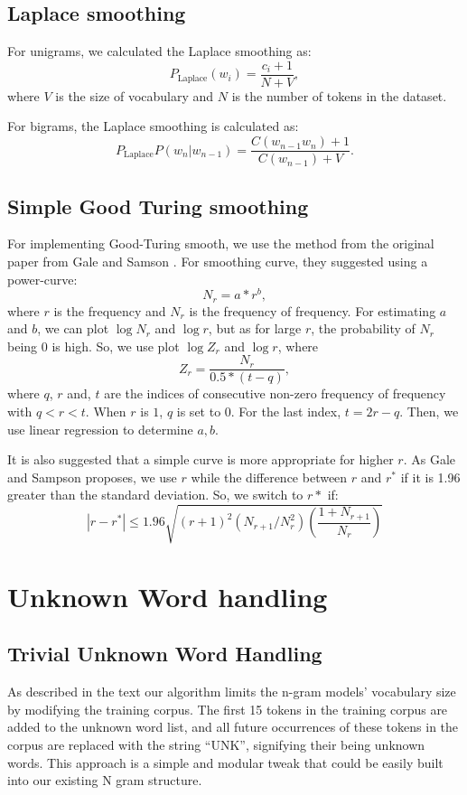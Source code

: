 \documentclass[12pt]{article}
\begin{document}
\subsection{Laplace smoothing}
For unigrams, we calculated the Laplace smoothing as:
\[P_{\text{Laplace}}(w_i) = \frac{c_i + 1}{N + V},\]
where $V$ is the size of vocabulary and $N$ is the number of tokens
in the dataset.

For bigrams, the Laplace smoothing is calculated as:
\[P_{\text{Laplace}}P(w_n|w_{n-1}) = 
\frac{C(w_{n-1}w_n)  + 1}{C(w_{n-1}) + V}.\]

\subsection{Simple Good Turing smoothing}

For implementing Good-Turing smooth, we use the method from the original
paper from Gale and Samson \cite{gale1995good}. For smoothing curve,
they suggested using a power-curve:
\[N_r = a * r^b,\]
where $r$ is the frequency and $N_r$ is the frequency of frequency. For
estimating $a$ and $b$, we can plot $\log N_r$ and $\log r$, but as for
large $r$, the probability of $N_r$ being $0$ is high. So, we use plot
$\log Z_r$ and $\log r$, where
\[Z_r = \frac{N_r}{0.5 * (t-q)},\]
where $q$, $r$ and, $t$ are the indices of consecutive non-zero frequency
of frequency with $q < r < t$. When $r$ is $1$, $q$ is set to 0. For the
last index, $t = 2r - q$. Then, we use linear regression to determine $a, b$.

It is also suggested that a simple curve is more appropriate for higher $r$.
As Gale and Sampson \cite{gale1995good} proposes, we use $r$ while the
difference between $r$ and $r^{*}$ if it is 1.96 greater than the
standard deviation. So, we switch to $r*$ if:
\[ |r - r^*| \leq 1.96 \sqrt{(r+1)^2 \left(N_{r + 1} / N_{r}^{2}\right)
\left(\frac{1 + N_{r+1}}{N_r}\right)}\]


\section{Unknown Word handling}
\subsection{Trivial Unknown Word Handling}


As described in the text \cite{jurafskybook2009} our algorithm limits the n-gram models’ vocabulary size by modifying the training corpus. The first 15 tokens in the training corpus are added to the unknown word list, and all future occurrences of these tokens in the corpus are replaced with the string ``UNK'', signifying their being unknown words. This approach is a simple and modular tweak that could be easily built into our existing N gram structure.
\end{document}
